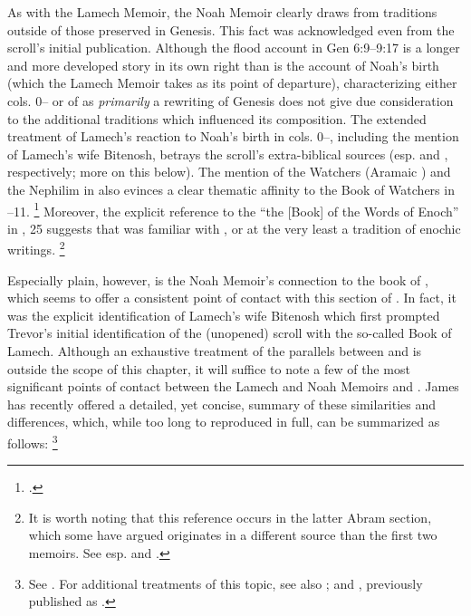 As with the Lamech Memoir, the Noah Memoir clearly draws from traditions outside of those preserved in Genesis. This fact was acknowledged even from the scroll's initial publication.%
    \autocite[38]{avigad-yadin1956}
Although the flood account in Gen 6:9--9:17 is a longer and more developed story in its own right than is the account of Noah's birth (which the Lamech Memoir takes as its point of departure), characterizing either cols. 0-- or  of \ga as \emph{primarily} a rewriting of Genesis does not give due consideration to the additional traditions which influenced its composition. The extended treatment of Lamech's reaction to Noah's birth in cols. 0--, including the mention of Lamech's wife Bitenosh, betrays the scroll's extra-biblical sources (esp. \firstenoch and \jub, respectively; more on this below). The mention of the Watchers (Aramaic ) and the Nephilim in  also evinces a clear thematic affinity to the Book of Watchers in --11.%
    \footnote{\Cite[174]{nickelsburg2005}.}
Moreover, the explicit reference to the ``the [Book] of the Words of Enoch'' in , 25 suggests that \ga was familiar with \firstenoch, or at the very least a tradition of enochic writings.%
    \footnote{It is worth noting that this reference occurs in the latter Abram section, which some have argued originates in a different source than the first two memoirs. See esp. \cite{bernstein_berthelot-etal2010} and \cite{bernstein_as2010}.}

Especially plain, however, is the Noah Memoir's connection to the book of \jub, which seems to offer a consistent point of contact with this section of \ga.%
    \autocite[20]{fitzmyer2004}
In fact, it was the explicit identification of Lamech's wife Bitenosh which first prompted Trevor's initial identification of the (unopened) scroll with the so-called Book of Lamech.%
    \autocite{trevor_basor1949}
Although an exhaustive treatment of the parallels between \jub and \ga is outside the scope of this chapter, it will suffice to note a few of the most significant points of contact between the Lamech and Noah Memoirs and \jub. James \vanderkam has recently offered a detailed, yet concise, summary of these similarities and differences, which, while too long to reproduced in full, can be summarized as follows:%
    \footnote{See \cite[374--376]{vanderkam_feldman-etal2017}. For additional treatments of this topic, see also 
    \cite{machiela2009}; \cite{machiela_mason-etal2012} and 
    \cite[305--342]{kugel2012}, previously published as 
    \cite{kugel_roitman-etal2011}.} 

